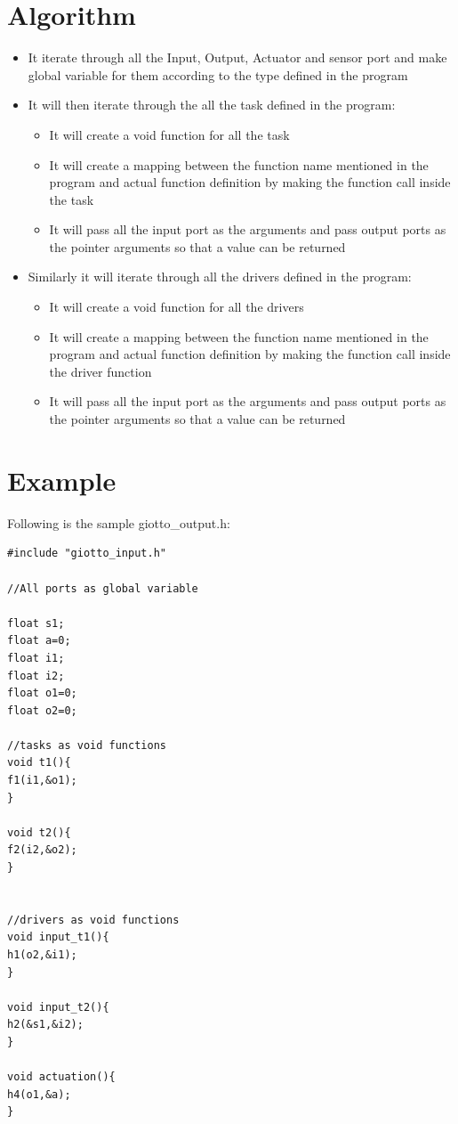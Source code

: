\documentclass[16pt]{report}
\begin{document}
\section{Algorithm}
\begin{itemize}
    \item It iterate through all the Input, Output, Actuator and sensor port and make global variable for them according to the type defined in the program
    \item It will then iterate through the all the task defined in the program:
    \begin{itemize}
        \item It will create a void function for all the task 
        \item It will create a mapping between the function name mentioned in the program and actual function definition by making the function call inside the task
        \item It will pass all the input port as the arguments and pass output ports as the pointer arguments so that a value can be returned
    \end{itemize}
    
    \item Similarly it will iterate through all the drivers defined in the program:
    \begin{itemize}
        \item It will create a void function for all the drivers 
        \item It will create a mapping between the function name mentioned in the program and actual function definition by making the function call inside the driver function
        \item It will pass all the input port as the arguments and pass output ports as the pointer arguments so that a value can be returned
    \end{itemize}
\end{itemize}

\section{Example}
Following is the sample giotto\_output.h:
\begin{verbatim}
#include "giotto_input.h"

//All ports as global variable

float s1;
float a=0;
float i1;
float i2;
float o1=0;
float o2=0;

//tasks as void functions
void t1(){
f1(i1,&o1);
}

void t2(){
f2(i2,&o2);
}


//drivers as void functions
void input_t1(){
h1(o2,&i1);
}

void input_t2(){
h2(&s1,&i2);
}

void actuation(){
h4(o1,&a);
}

\end{verbatim}
\end{document}
